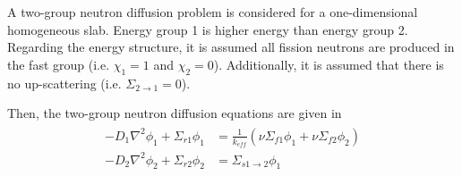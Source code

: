   A two-group neutron diffusion problem is considered for a one-dimensional
  homogeneous slab. Energy group 1 is higher energy than energy group 2. 
  Regarding the energy structure, it is assumed all fission neutrons are 
  produced in the fast group (i.e. $\chi_1=1$ and $\chi_2=0$). Additionally, 
  it is assumed that there is no up-scattering 
  (i.e. $\Sigma_{2\rightarrow1}=0$).
  
  Then, the two-group neutron diffusion equations are given in 
  \begin{align} \label{eq:twogroup}
  \begin{split}
    -D_1 \nabla^2 \phi_1 + \Sigma_{r1} \phi_1 &= \frac{1}{k_{eff}} \left(\nu 
      \Sigma_{f1} \phi_1 + \nu \Sigma_{f2} \phi_2 \right) \\
    -D_2 \nabla^2 \phi_2 + \Sigma_{r2} \phi_2 &= \Sigma_{s1\rightarrow2} 
      \phi_1 
  \end{split}
  \end{align}
  
